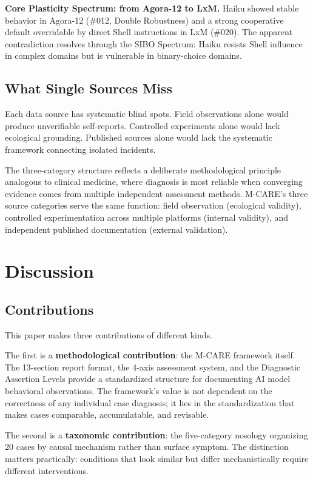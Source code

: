 \documentclass[11pt]{article}
\begin{document}
\textbf{Core Plasticity Spectrum: from Agora-12 to LxM.} Haiku showed stable behavior in Agora-12 (\#012, Double Robustness) and a strong cooperative default overridable by direct Shell instructions in LxM (\#020). The apparent contradiction resolves through the SIBO Spectrum: Haiku resists Shell influence in complex domains but is vulnerable in binary-choice domains.

\subsection{What Single Sources Miss}

Each data source has systematic blind spots. Field observations alone would produce unverifiable self-reports. Controlled experiments alone would lack ecological grounding. Published sources alone would lack the systematic framework connecting isolated incidents.

The three-category structure reflects a deliberate methodological principle analogous to clinical medicine, where diagnosis is most reliable when converging evidence comes from multiple independent assessment methods. M-CARE's three source categories serve the same function: field observation (ecological validity), controlled experimentation across multiple platforms (internal validity), and independent published documentation (external validation).

\section{Discussion}

\subsection{Contributions}

This paper makes three contributions of different kinds.

The first is a \textbf{methodological contribution}: the M-CARE framework itself. The 13-section report format, the 4-axis assessment system, and the Diagnostic Assertion Levels provide a standardized structure for documenting AI model behavioral observations. The framework's value is not dependent on the correctness of any individual case diagnosis; it lies in the standardization that makes cases comparable, accumulatable, and revisable.

The second is a \textbf{taxonomic contribution}: the five-category nosology organizing 20 cases by causal mechanism rather than surface symptom. The distinction matters practically: conditions that look similar but differ mechanistically require different interventions.
\end{document}
